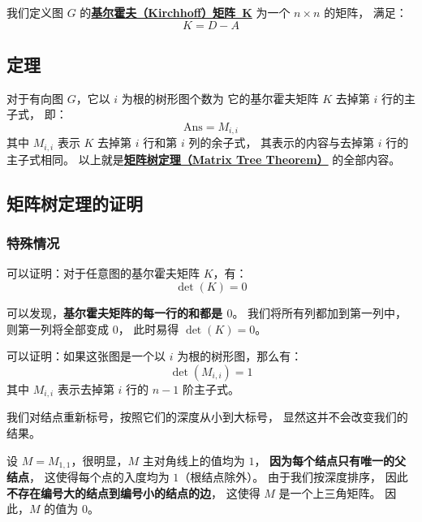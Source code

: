 \documentclass[UTF8]{article}
\begin{document}
	我们定义图 $G$ 的\textbf{\uline{基尔霍夫（Kirchhoff）矩阵~K}}
	为一个 $n \times n$ 的矩阵，
	满足：
	$$
	K = D - A
	$$

	\subsection{定理}

	对于有向图 $G$，它以 $i$ 为根的树形图个数为
	它的基尔霍夫矩阵 $K$ 去掉第 $i$ 行的主子式，
	即：
	$$
	\mathrm{Ans} = M_{i, i}
	$$
	其中 $M_{i, i}$ 表示 $K$ 去掉第 $i$ 行和第 $i$ 列的余子式，
	其表示的内容与去掉第 $i$ 行的主子式相同。
	以上就是\textbf{\uline{矩阵树定理（Matrix Tree Theorem）}}
	的全部内容。

	\subsection{矩阵树定理的证明}

	\subsubsection{特殊情况}


	可以证明：对于任意图的基尔霍夫矩阵 $K$，有：
	$$
	\det(K) = 0
	$$

	\bigskip


	可以发现，\textbf{基尔霍夫矩阵的每一行的和都是 $0$}。
	我们将所有列都加到第一列中，则第一列将全部变成 $0$，
	此时易得 $\det(K) = 0$。

	\bigskip


	可以证明：如果这张图是一个以 $i$ 为根的树形图，那么有：
	$$
	\det(M_{i, i}) = 1
	$$
	其中 $M_{i, i}$ 表示去掉第 $i$ 行的 $n - 1$ 阶主子式。

	\bigskip


	我们对结点重新标号，按照它们的深度从小到大标号，
	显然这并不会改变我们的结果。

	设 $M = M_{1, 1}$，很明显，$M$ 主对角线上的值均为 $1$，
	\textbf{因为每个结点只有唯一的父结点}，
	这使得每个点的入度均为 $1$（根结点除外）。
	由于我们按深度排序，
	因此\textbf{不存在编号大的结点到编号小的结点的边}，
	这使得 $M$ 是一个上三角矩阵。
	因此，$M$ 的值为 $0$。

	\bigskip

\end{document}
